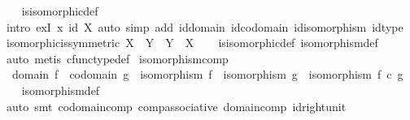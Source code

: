 \begin{isabellebody}
%
\isadelimproof
\ \ %
\endisadelimproof
%
\isatagproof
{}\isamarkupfalse%
\ is{\isacharunderscore}{\kern0pt}isomorphic{\isacharunderscore}{\kern0pt}def\isanewline
\ \ \isamarkupfalse%
\ {\isacharparenleft}{\kern0pt}intro\ exI{\isacharbrackleft}{\kern0pt}\ x{\isacharequal}{\kern0pt}\ {\isachardoublequoteopen}id\ X{\isachardoublequoteclose}{\isacharbrackright}{\kern0pt}{\isacharcomma}{\kern0pt}\ auto\ simp\ add{\isacharcolon}{\kern0pt}\ id{\isacharunderscore}{\kern0pt}domain\ id{\isacharunderscore}{\kern0pt}codomain\ id{\isacharunderscore}{\kern0pt}isomorphism\ id{\isacharunderscore}{\kern0pt}type{\isacharparenright}{\kern0pt}%
\endisatagproof
{\isafoldproof}%
%
\isadelimproof
\isanewline
%
\endisadelimproof
\isanewline
{}\isamarkupfalse%
\ isomorphic{\isacharunderscore}{\kern0pt}is{\isacharunderscore}{\kern0pt}symmetric{\isacharcolon}{\kern0pt}\ {\isachardoublequoteopen}X\ {\isasymcong}\ Y\ {\isasymlongrightarrow}\ Y\ {\isasymcong}\ X{\isachardoublequoteclose}\isanewline
%
\isadelimproof
\ \ %
\endisadelimproof
%
\isatagproof
{}\isamarkupfalse%
\ is{\isacharunderscore}{\kern0pt}isomorphic{\isacharunderscore}{\kern0pt}def\ isomorphism{\isacharunderscore}{\kern0pt}def\ \isanewline
\ \ \isamarkupfalse%
\ {\isacharparenleft}{\kern0pt}auto{\isacharcomma}{\kern0pt}\ metis\ cfunc{\isacharunderscore}{\kern0pt}type{\isacharunderscore}{\kern0pt}def{\isacharparenright}{\kern0pt}%
\endisatagproof
{\isafoldproof}%
%
\isadelimproof
\isanewline
%
\endisadelimproof
\isanewline
{}\isamarkupfalse%
\ isomorphism{\isacharunderscore}{\kern0pt}comp{\isacharcolon}{\kern0pt}\ \isanewline
\ \ {\isachardoublequoteopen}domain\ f\ {\isacharequal}{\kern0pt}\ codomain\ g\ {\isasymLongrightarrow}\ isomorphism\ f\ {\isasymLongrightarrow}\ isomorphism\ g\ {\isasymLongrightarrow}\ isomorphism\ {\isacharparenleft}{\kern0pt}f\ {\isasymcirc}\isactrlsub c\ g{\isacharparenright}{\kern0pt}{\isachardoublequoteclose}\isanewline
%
\isadelimproof
\ \ %
\endisadelimproof
%
\isatagproof
{}\isamarkupfalse%
\ isomorphism{\isacharunderscore}{\kern0pt}def\ \isamarkupfalse%
\ {\isacharparenleft}{\kern0pt}auto{\isacharcomma}{\kern0pt}\ smt\ codomain{\isacharunderscore}{\kern0pt}comp\ comp{\isacharunderscore}{\kern0pt}associative\ domain{\isacharunderscore}{\kern0pt}comp\ id{\isacharunderscore}{\kern0pt}right{\isacharunderscore}{\kern0pt}unit{\isacharparenright}{\kern0pt}%
\endisatagproof
{\isafoldproof}%
%
\isadelimproof
\isanewline
%
\endisadelimproof

\end{isabellebody}
